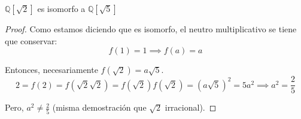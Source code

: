 \begin{ce}
    $\mathbb{Q}[\sqrt{2}]$ es isomorfo a $\mathbb{Q}[\sqrt{5}]$
\end{ce}

\begin{proof}
    Como estamos diciendo que es isomorfo, el neutro multiplicativo se tiene que conservar:
    \begin{equation}
        f(1) = 1 \implies f(a) = a
    \end{equation}

    Entonces, necesariamente $f(\sqrt{2}) = a\sqrt{5}$.
    \begin{equation}
        2 = f(2) = f(\sqrt{2}\sqrt{2}) = f(\sqrt{2})f(\sqrt{2}) = (a\sqrt{5})^2 = 5a^2 \implies a^2 = \frac{2}{5}
    \end{equation}

    Pero, $a^2 \neq \frac{2}{5}$ (misma demostración que $\sqrt{2}$ irracional).
\end{proof}
